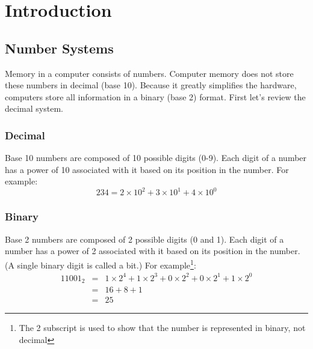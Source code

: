 \chapter{Introduction}
\section{Number Systems}

Memory in a computer consists of numbers. Computer memory does not
store these numbers in decimal (base 10). Because it greatly
simplifies the hardware, computers store all information in a binary
(base 2) format. First let's review the decimal system.

\subsection{Decimal}

Base 10 numbers are composed of 10 possible digits (0-9). Each digit
of a number has a power of 10 associated with it based on its position
in the number. For example:
\begin{displaymath}
234 = 2 \times 10^2 + 3 \times 10^1 + 4 \times 10^0
\end{displaymath}

\subsection{Binary}

Base 2 numbers are composed of 2 possible digits (0 and 1). Each digit
of a number has a power of 2 associated with it based on its position
in the number. (A single binary digit is called a bit.) For
example\footnote{The 2 subscript is used to show that the number is
represented in binary, not decimal}:
\begin{eqnarray*}
11001_2 & = & 1 \times 2^4 + 1 \times 2^3 + 0 \times 2^2 + 0 \times 2^1
              + 1 \times 2^0 \\
 & = & 16 + 8 + 1 \\
 & = & 25
\end{eqnarray*}

